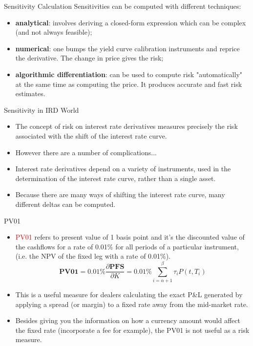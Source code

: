 \documentclass{beamer}
\begin{document}
\begin{frame}{Sensitivity Calculation}
Sensitivities can be computed with different techniques:
\begin{itemize}
	\item \textbf{analytical}: involves deriving a closed-form expression which can be complex (and not always feasible);
	\item \textbf{numerical}: one bumps the yield curve calibration instruments and reprice the derivative. The change in price gives the risk;
	\item \textbf{algorithmic differentiation}: can be used to compute risk "automatically" at the same time as computing the price. It produces accurate and fast risk estimates.
\end{itemize}
\end{frame}

\begin{frame}{Sensitivity in IRD World}
\begin{itemize}
\item<1-> The concept of risk on interest rate derivatives measures precisely the risk associated with the shift of the interest rate curve. 
\item<2-> However there are a number of complications...
\item<2-> Interest rate derivatives depend on a variety of instruments, used in the determination of the interest rate curve, rather than a single asset.
\item<3-> Because there are many ways of shifting the interest rate curve, many different deltas can be computed. 
\end{itemize}
\end{frame}

\begin{frame}{PV01}
\begin{itemize}
    \item<1-> \textcolor{red}{PV01} refers to present value of 1 basis point and it's the discounted value of the cashflows for a rate of 0.01\% for all periods of a particular instrument, (i.e. the NPV of the fixed leg with a rate of 0.01\%).
	\begin{equation}
	   \textbf{PV01} = 0.01\% \frac{\partial \textbf{PFS}}{\partial K} = 0.01\% \sum_{i=\alpha+1}^\beta\tau_iP(t,T_i)
	\end{equation}
	\item<2-> This is a useful measure for dealers calculating the exact P\&L generated by applying a spread (or margin) to a fixed rate away from the mid-market rate.
   \item<3-> Besides giving you the information on how a currency amount would affect the fixed rate (incorporate a fee for example), the PV01 is not useful as a risk measure. 
\end{itemize}
\end{frame}
\end{document}
